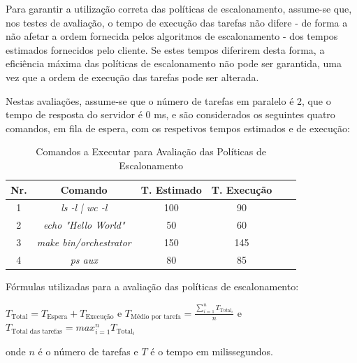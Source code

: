 \documentclass[a4paper,11pt]{scrreprt}
\begin{document}
    Para garantir a utilização correta das políticas de escalonamento,
    assume-se que, nos testes de avaliação, o tempo de execução das tarefas
    não difere - de forma a não afetar a ordem fornecida pelos algoritmos
    de escalonamento - dos tempos estimados fornecidos pelo cliente.
    Se estes tempos diferirem desta forma, a eficiência máxima das políticas de escalonamento
    não pode ser garantida, uma vez que a ordem de execução das tarefas pode ser alterada.

    Nestas avaliações, assume-se que o número de tarefas em paralelo é 2,
    que o tempo de resposta do servidor é 0 ms,
    e são considerados os seguintes quatro comandos, em fila de espera,
    com os respetivos tempos estimados e de execução:

    \begin{table}[!ht]
        \centering
        \begin{tabular}{|c|c|c|c|c|c|}
            \hline
            \rowcolor{gray!20!white}
            \textbf{Nr.} & \textbf{Comando} & \textbf{T. Estimado} & \textbf{T. Execução} \\
            \hline
            1 & \textit{ls -l | wc -l} & 100 &  90 \\
            \hline
            2 & \textit{echo "Hello World"} &  50 &  60 \\
            \hline
            3 & \textit{make bin/orchestrator} & 150 & 145 \\
            \hline
            4 & \textit{ps aux} &  80 &  85 \\
            \hline
        \end{tabular}
        \caption{\small Comandos a Executar para Avaliação das Políticas de Escalonamento}
    \end{table}

    Fórmulas utilizadas para a avaliação das políticas de escalonamento:

    \begin{minipage}{\textwidth}
        \centering
        $T_{\text{Total}} = T_{\text{Espera}} + T_{\text{Execução}}$
        \quad e \quad
        $T_{\text{Médio por tarefa}} = \frac{\sum_{i=1}^{n} T_{\text{Total}_{i}}}{n}$
        \quad e \quad
        $T_{\text{Total das tarefas}} = max_{i=1}^{n} T_{\text{Total}_{i}}$

        \vspace{0.2cm}
        onde $n$ é o número de tarefas e $T$ é o tempo em milissegundos.
    \end{minipage}
\end{document}
